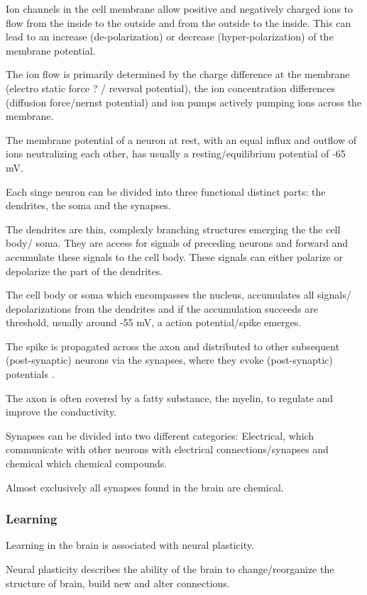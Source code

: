 Ion channels in the cell membrane allow positive and negatively charged ions to flow from the inside to the outside and from the outside to the inside.
This can lead to an increase (de-polarization) or decrease (hyper-polarization) of the membrane potential.

The ion flow is primarily determined by the charge difference at the membrane (electro static force ? / reversal potential), the ion concentration differences (diffusion force/nernst potential) and ion pumps actively pumping ions across the membrane.

The membrane potential of a neuron at rest, with an equal influx and outflow of ions neutralizing each other, has usually a resting/equilibrium potential of -65 mV. 

Each singe neuron can be divided into three functional distinct parts: the dendrites, the soma and the synapses.

The dendrites are thin, complexly branching structures emerging the the cell body/ soma.
They are access for signals of preceding neurons and forward and accumulate these signals to the cell body. 
These signals can either polarize or depolarize the part of the dendrites. 

The cell body or soma which encompasses the nucleus, accumulates all signals/ depolarizations from the dendrites and if the accumulation succeeds are threshold, usually around -55 mV, a action potential/spike emerges.

The spike is propagated across the axon and distributed to other subsequent (post-synaptic) neurons via the synapses, where they evoke (post-synaptic) potentials .

The axon is often covered by a fatty substance, the myelin, to regulate and improve the conductivity.

Synapses can be divided into two different categories: Electrical, which communicate with other neurons with electrical connections/synapses and chemical which chemical compounds.

Almost exclusively all synapses found in the brain are chemical.

\subsubsection{Learning}

Learning in the brain is associated with neural plasticity.

Neural plasticity describes the ability of the brain to change/reorganize the structure of brain, build new and alter connections.  

